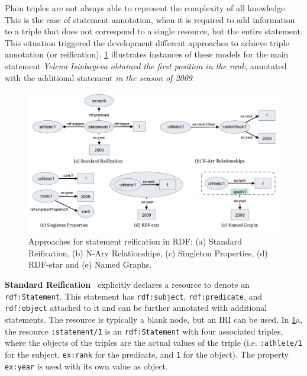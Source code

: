 
Plain triples are not always able to represent the complexity of all knowledge. This is the case of statement annotation, when it is required to add information to a triple that does not correspond to a single resource, but the entire statement. This situation triggered the development different approaches to achieve triple annotation (or reification). \cref{fig:chp2_reification} illustrates instances of these models for the main statement \textit{Yelena Isinbayeva obtained the first position in the rank}, annotated with the additional statement \textit{in the season of 2009}. 

\begin{figure}[t]
\centering
\includegraphics[width=\linewidth]{figures/chp2_reifications.pdf}
\caption[Approaches for statement reification in RDF]{Approaches for statement reification in RDF: (a) Standard Reification, (b) N-Ary Relationships, (c) Singleton Properties, (d) RDF-star and (e) Named Graphs.}
\label{fig:chp2_reification}
\end{figure}

\noindent\textbf{Standard Reification}~\parencite{lassila1999rdf} explicitly declares a resource to denote an \texttt{rdf:Statement}.
This statement has \texttt{rdf:subject}, \texttt{rdf:predicate}, and \texttt{rdf:object} attached to it and can be further annotated with additional statements. The resource is typically a blank node, but an IRI can be used. 
In \cref{fig:chp2_reification}a, the resource \texttt{:statement/1} is an \texttt{rdf:Statement} with four associated triples, where the objects of the triples are the actual values of the triple (i.e. \texttt{:athlete/1} for the subject, \texttt{ex:rank} for the predicate, and \texttt{1} for the object). The property \texttt{ex:year} is used with its own value as object.


